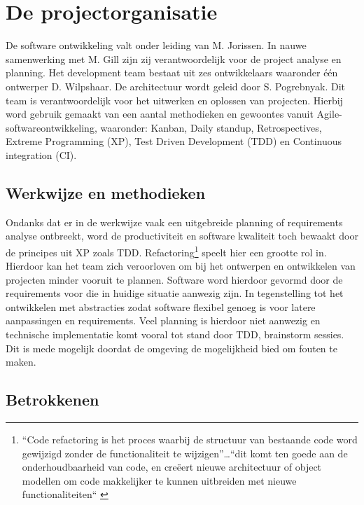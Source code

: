 \clearpage

\section{De projectorganisatie} %

De software ontwikkeling valt onder leiding van M. Jorissen. In nauwe samenwerking met M. Gill zijn zij verantwoordelijk voor de project analyse en planning. Het development team bestaat uit zes ontwikkelaars waaronder één ontwerper D. Wilpshaar.
De architectuur wordt geleid door S. Pogrebnyak. Dit team is verantwoordelijk voor het uitwerken en oplossen van projecten. Hierbij word gebruik gemaakt van een aantal methodieken en gewoontes vanuit Agile-softwareontwikkeling, waaronder: Kanban, Daily standup, Retrospectives, Extreme Programming (XP), Test Driven Development (TDD) en Continuous integration (CI).

    \subsection{Werkwijze en methodieken}

    Ondanks dat er in de werkwijze vaak een uitgebreide planning of requirements analyse ontbreekt, word de productiviteit en software kwaliteit toch bewaakt door de principes uit XP zoals TDD. Refactoring\footnote{“Code refactoring is het proces waarbij de structuur van bestaande code word gewijzigd zonder de functionaliteit te wijzigen”…“dit komt ten goede aan de onderhoudbaarheid van code, en creëert nieuwe architectuur of object modellen om code makkelijker te kunnen uitbreiden met nieuwe functionaliteiten“ \parencite{refactoring-ruby}} speelt hier een grootte rol in.
    Hierdoor kan het team zich veroorloven om bij het ontwerpen en ontwikkelen van projecten minder vooruit te plannen. Software word hierdoor gevormd door de requirements voor die in huidige situatie aanwezig zijn. In tegenstelling tot het ontwikkelen met abstracties zodat software flexibel genoeg is voor latere aanpassingen en requirements. Veel planning is hierdoor niet aanwezig en technische implementatie komt vooral tot stand door TDD, brainstorm sessies. Dit is mede mogelijk doordat de omgeving de mogelijkheid bied om fouten te maken.

    \subsection{Betrokkenen}
    
